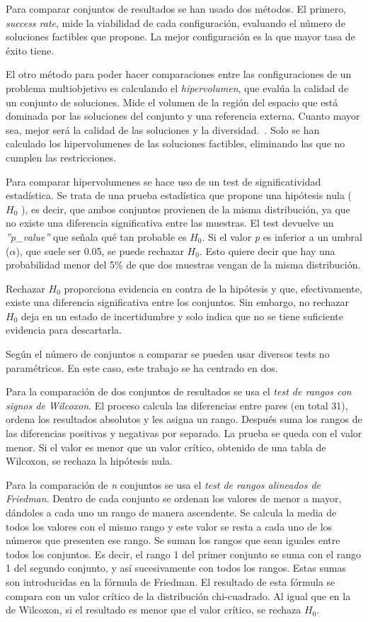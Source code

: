 Para comparar conjuntos de resultados se han usado dos métodos. El primero, \textit{success rate}, mide la viabilidad de cada configuración, evaluando el número de soluciones factibles que propone. La mejor configuración es la que mayor tasa de éxito tiene.

El otro método para poder hacer comparaciones entre las configuraciones de un problema multiobjetivo es calculando el \textit{hipervolumen}, que evalúa la calidad de un conjunto de soluciones. Mide el volumen de la región del espacio que está dominada por las soluciones del conjunto y una referencia externa. Cuanto mayor sea, mejor será la calidad de las soluciones y la diversidad.~\cite{pymoo2024hypervolume}. Solo se han calculado los hipervolumenes de las soluciones factibles, eliminando las que no cumplen las restricciones.

Para comparar hipervolumenes se hace uso de un test de significatividad estadística. Se trata de una prueba estadística que propone una hipótesis nula (\(H_0\) ), es decir, que ambos conjuntos provienen de la misma distribución, ya que no existe una diferencia significativa entre las muestras. El test devuelve un \textit{''p\_value''} que señala qué tan probable es \(H_0\). Si el valor \textit{p} es inferior a un umbral ($\alpha$), que suele ser 0.05, se puede rechazar \(H_0\). Esto quiere decir que hay una probabilidad menor del 5\% de que dos muestras vengan de la misma distribución.

Rechazar \(H_0\) proporciona evidencia en contra de la hipótesis y que, efectivamente, existe una diferencia significativa entre los conjuntos. Sin embargo, no rechazar \(H_0\) deja en un estado de incertidumbre y solo indica que no se tiene suficiente evidencia para descartarla.

Según el número de conjuntos a comparar se pueden usar diversos tests no paramétricos. En este caso, este trabajo se ha centrado en dos.

Para la comparación de dos conjuntos de resultados se usa el \textit{test de rangos con signos de Wilcoxon}. El proceso calcula las diferencias entre pares (en total 31), ordena los resultados absolutos y les asigna un rango. Después suma los rangos de las diferencias positivas y negativas por separado. La prueba se queda con el valor menor. Si el valor es menor que un valor crítico, obtenido de una tabla de Wilcoxon, se rechaza la hipótesis nula.~\cite{scipy2024wilcoxon}

Para la comparación de \textit{n} conjuntos se usa el \textit{test de rangos alineados de Friedman}. Dentro de cada conjunto se ordenan los valores de menor a mayor, dándoles a cada uno un rango de manera ascendente. Se calcula la media de todos los valores con el mismo rango y este valor se resta a cada uno de los números que presenten ese rango. Se suman los rangos que sean iguales entre todos los conjuntos. Es decir, el rango 1 del primer conjunto se suma con el rango 1 del segundo conjunto, y así sucesivamente con todos los rangos. Estas sumas son introducidas en la fórmula de Friedman. El resultado de esta fórmula se compara con un valor crítico de la distribución chi-cuadrado. Al igual que en la de Wilcoxon, si el resultado es menor que el valor crítico, se rechaza \(H_0\).~\cite{stac2024friedman}

